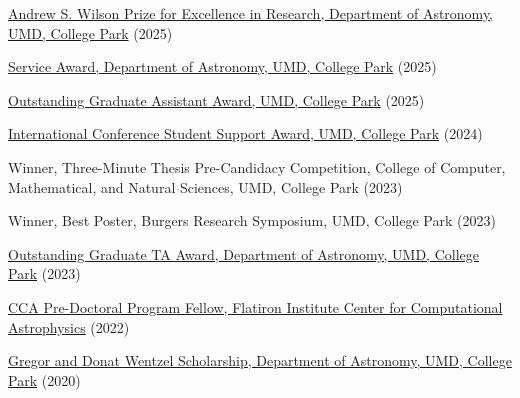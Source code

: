 \item[{\color{numcolor}\scriptsize14}] \href{https://www.astro.umd.edu/resources/internal/awards/dept/service.html}{Andrew S. Wilson Prize for Excellence in Research, Department of Astronomy, UMD, College Park} (2025)

\item[{\color{numcolor}\scriptsize13}] \href{https://www.astro.umd.edu/resources/internal/awards/dept/service.html}{Service Award, Department of Astronomy, UMD, College Park} (2025)


\item[{\color{numcolor}\scriptsize12}] \href{https://gradschool.umd.edu/sites/default/files/2025-05/OGA_AY24-25.pdf}{Outstanding Graduate Assistant Award, UMD, College Park} (2025)

\item[{\color{numcolor}\scriptsize11}] \href{https://gradschool.umd.edu/funding/student-fellowships-awards/graduate-school-travel-grants}{International Conference Student Support Award, UMD, College Park} (2024)

\item[{\color{numcolor}\scriptsize10}] Winner, Three-Minute Thesis Pre-Candidacy Competition, College of Computer, Mathematical, and Natural Sciences, UMD, College Park (2023)

\item[{\color{numcolor}\scriptsize9}] Winner, Best Poster, Burgers Research Symposium, UMD, College Park (2023)

\item[{\color{numcolor}\scriptsize8}] \href{https://www.astro.umd.edu/resources/internal/awards/dept/angerhofer.html}{Outstanding Graduate TA Award, Department of Astronomy, UMD, College Park} (2023)

\item[{\color{numcolor}\scriptsize7}] \href{https://www.simonsfoundation.org/flatiron-institute-center-for-computational-astrophysics-pre-doctoral-program/}{CCA Pre-Doctoral Program Fellow, Flatiron Institute Center for Computational Astrophysics} (2022)

\item[{\color{numcolor}\scriptsize6}] \href{https://www.astro.umd.edu/resources/internal/awards/dept/wentzel.html}{Gregor and Donat Wentzel Scholarship, Department of Astronomy, UMD, College Park} (2020)


